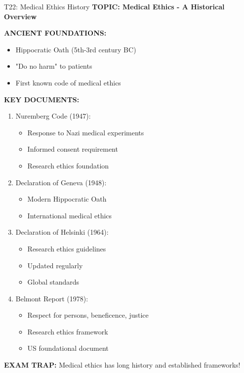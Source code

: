 \documentclass[8pt]{beamer}
\begin{document}
	\begin{frame}{T22: Medical Ethics History}
		\fontsize{6.5}{7.5}\selectfont
		\textbf{TOPIC: Medical Ethics - A Historical Overview}
		
		\vspace{0.1cm}
		\textbf{ANCIENT FOUNDATIONS:}
		\begin{itemize}
			\item Hippocratic Oath (5th-3rd century BC)
			\item "Do no harm" to patients
			\item First known code of medical ethics
		\end{itemize}
		
		\vspace{0.1cm}
		\textbf{KEY DOCUMENTS:}
		\begin{enumerate}
			\item \textcolor{myblue}{Nuremberg Code (1947):}
			\begin{itemize}
				\item Response to Nazi medical experiments
				\item Informed consent requirement
				\item Research ethics foundation
			\end{itemize}
			\item \textcolor{myblue}{Declaration of Geneva (1948):}
			\begin{itemize}
				\item Modern Hippocratic Oath
				\item International medical ethics
			\end{itemize}
			\item \textcolor{myblue}{Declaration of Helsinki (1964):}
			\begin{itemize}
				\item Research ethics guidelines
				\item Updated regularly
				\item Global standards
			\end{itemize}
			\item \textcolor{myblue}{Belmont Report (1978):}
			\begin{itemize}
				\item Respect for persons, beneficence, justice
				\item Research ethics framework
				\item US foundational document
			\end{itemize}
		\end{enumerate}
		
		\textcolor{myred}{\textbf{EXAM TRAP:}} Medical ethics has \textcolor{myblue}{long history and established frameworks}!
	\end{frame}
	
\end{document}
